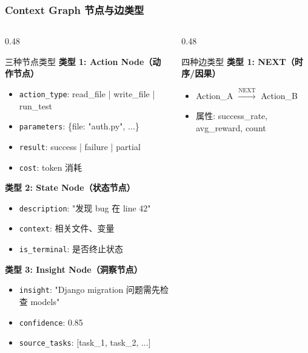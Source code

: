 \documentclass[aspectratio=169,10pt]{beamer}
\begin{document}
\begin{frame}
  \frametitle{Context Graph 节点与边类型}

  \begin{columns}[T]
    \begin{column}{0.48\textwidth}
      \begin{block}{三种节点类型}
        \scriptsize
        \textbf{类型 1: Action Node（动作节点）}
        \begin{itemize}
          \item \texttt{action\_type}: read\_file | write\_file | run\_test
          \item \texttt{parameters}: \{file: "auth.py", ...\}
          \item \texttt{result}: success | failure | partial
          \item \texttt{cost}: token 消耗
        \end{itemize}

        \vspace{0.2cm}

        \textbf{类型 2: State Node（状态节点）}
        \begin{itemize}
          \item \texttt{description}: "发现 bug 在 line 42"
          \item \texttt{context}: 相关文件、变量
          \item \texttt{is\_terminal}: 是否终止状态
        \end{itemize}

        \vspace{0.2cm}

        \textbf{类型 3: Insight Node（洞察节点）}
        \begin{itemize}
          \item \texttt{insight}: "Django migration 问题需先检查 models"
          \item \texttt{confidence}: 0.85
          \item \texttt{source\_tasks}: [task\_1, task\_2, ...]
        \end{itemize}
      \end{block}
    \end{column}

    \begin{column}{0.48\textwidth}
      \begin{block}{四种边类型}
        \scriptsize
        \textbf{类型 1: NEXT（时序/因果）}
        \begin{itemize}
          \item Action\_A $\xrightarrow{\text{NEXT}}$ Action\_B
          \item 属性: success\_rate, avg\_reward, count
        \end{itemize}


\end{block}
\end{column}
\end{columns}
\end{frame}
\end{document}
